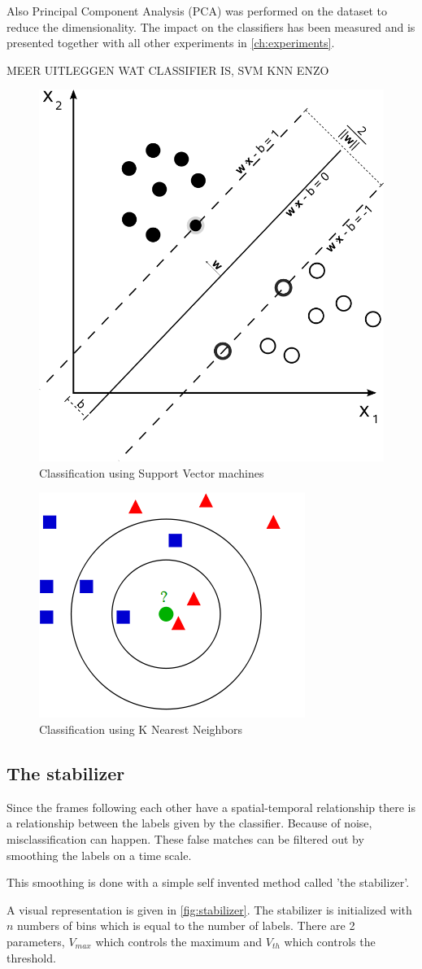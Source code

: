 Also Principal Component Analysis (PCA) was performed on the dataset to reduce the dimensionality. The impact on the classifiers has been measured and is presented together with all other experiments in \autoref{ch:experiments}.

MEER UITLEGGEN WAT CLASSIFIER IS, SVM KNN ENZO

\begin{figure}[htbp]
\center{}
\includegraphics[width=0.3\linewidth]{figures/svm.png}
\caption{Classification using Support Vector machines}
\label{fig:svm}
\end{figure}

\begin{figure}[htbp]
\center{}
\includegraphics[width=0.3\linewidth]{figures/knn.png}
\caption{Classification using K Nearest Neighbors}
\label{fig:fail}
\end{figure}


\subsection*{The stabilizer}
Since the frames following each other have a spatial-temporal relationship there is a relationship between the labels given by the classifier. Because of noise, misclassification can happen. These false matches can be filtered out by smoothing the labels on a time scale.

This smoothing is done with a simple self invented method called 'the stabilizer'.

A visual representation is given in \autoref{fig:stabilizer}. The stabilizer is initialized with $n$ numbers of bins which is equal to the number of labels. There are 2 parameters, $V_{max}$ which controls the maximum and $V_{th}$ which controls the threshold.

